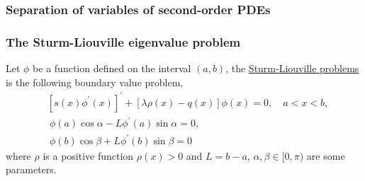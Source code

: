 




\subsubsection{Separation of variables of second-order PDEs}

\subsubsection{The Sturm-Liouville eigenvalue problem}\label{sec.Sturm_Liouville}

\begin{definition}
Let $\phi$ be a function defined on the interval $(a, b)$, the \underline{Sturm-Liouville problems} is the following boundary value problem,
\begin{equation}\label{eq.Sturm_Liouville}
    \begin{split}
        &\left[s(x) \phi^{\prime}(x)\right]^{\prime}+[\lambda \rho(x)-q(x)] \phi(x)=0, \quad a<x<b,
        \\
        &\ \phi(a) \cos \alpha-L \phi^{\prime}(a) \sin \alpha=0,
        \\
        &\ \phi(b) \cos \beta+L \phi^{\prime}(b) \sin \beta=0
    \end{split}
\end{equation}
where $\rho$ is a positive function $\rho(x)>0$ and $L=b-a$, $\alpha, \beta \in[0, \pi)$ are some parameters. 
\end{definition}


